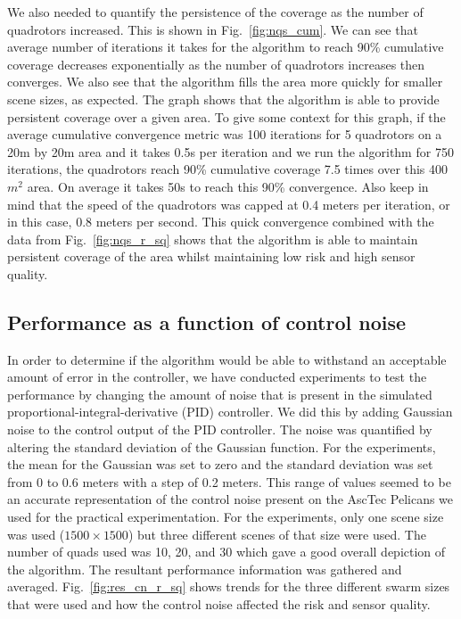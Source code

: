 \documentclass{article}
\begin{document}
We also needed to quantify the persistence of the coverage as the number of
quadrotors increased. This is shown in Fig.~\ref{fig:nqs_cum}. We can see that
average number of iterations it takes for the algorithm to reach 90\%
cumulative coverage decreases exponentially as the number of quadrotors
increases then converges. We also see that the algorithm fills the area more
quickly for smaller scene sizes, as expected. The graph shows that the
algorithm is able to provide persistent coverage over a given area. To give
some context for this graph, if the average cumulative convergence metric was
100 iterations for 5 quadrotors on a 20m by 20m area and it takes 0.5s per
iteration and we run the algorithm for 750 iterations, the quadrotors reach
90\% cumulative coverage 7.5 times over this 400~$m^2$ area. On average it
takes 50s to reach this 90\% convergence. Also keep in mind that the speed of
the quadrotors was capped at 0.4 meters per iteration, or in this case, 0.8
meters per second. This quick convergence combined with the data from
Fig.~\ref{fig:nqs_r_sq} shows that the algorithm is able to maintain persistent
coverage of the area whilst maintaining low risk and high sensor quality.

\subsection{Performance as a function of control noise}

In order to determine if the algorithm would be able to withstand an acceptable
amount of error in the controller, we have conducted experiments to test the
performance by changing the amount of noise that is present in the simulated
proportional-integral-derivative (PID) controller. We did this by adding
Gaussian noise to the control output of the PID controller. The noise was
quantified by altering the standard deviation of the Gaussian function. For the
experiments, the mean for the Gaussian was set to zero and the standard
deviation was set from 0 to 0.6 meters with a step of 0.2 meters. This range of
values seemed to be an accurate representation of the control noise present on
the AscTec Pelicans we used for the practical experimentation. For the
experiments, only one scene size was used ($1500 \times 1500$) but three
different scenes of that size were used. The number of quads used was 10, 20,
and 30 which gave a good overall depiction of the algorithm. The resultant
performance information was gathered and averaged. Fig.~\ref{fig:res_cn_r_sq}
shows trends for the three different swarm sizes that were used and how the
control noise affected the risk and sensor quality.
\end{document}
